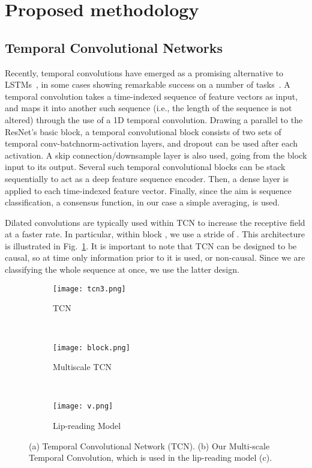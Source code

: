 \documentclass{article}
\begin{document}
\section{Proposed methodology}
\label{Methodology}


\subsection{Temporal Convolutional Networks} 
\label{ssec:tcn}

Recently, temporal convolutions have emerged as a promising alternative to LSTMs~\cite{BaiTCN2018}, in some cases showing remarkable success on a number of tasks~\cite{wavenet}. A temporal convolution takes a time-indexed sequence of feature vectors as input, and maps it into another such sequence (i.e., the length of the sequence is not altered) through the use of a 1D temporal convolution. Drawing a parallel to the ResNet's basic block, a temporal convolutional block consists of two sets of temporal conv-batchnorm-activation layers, and dropout can be used after each activation. A skip connection/downsample layer is also used, going from the block input to its output. Several such temporal convolutional blocks can be stack sequentially to act as a deep feature sequence encoder. Then, a dense layer is applied to each time-indexed feature vector. Finally, since the aim is sequence classification, a consensus function, in our case a simple averaging, is used.

Dilated convolutions are typically used within TCN to increase the receptive field at a faster rate. In particular, within block , we use a stride of . This architecture is illustrated in Fig.~\ref{fig:TCN}. It is important to note that TCN can be designed to be causal, so at time  only information prior to it is used, or non-causal. Since we are classifying the whole sequence at once, we use the latter design.


\begin{figure*}
    \centering
    \begin{subfigure}[b]{0.45\textwidth}
        \texttt{[image: tcn3.png]}
        \caption{TCN}
        \label{fig:TCN}
    \end{subfigure}
    ~ \begin{subfigure}[b]{0.34\textwidth}
        \texttt{[image: block.png]}
        \caption{Multiscale TCN}
        \label{fig:MultiTCN}
    \end{subfigure} 
    ~ \begin{subfigure}[b]{0.18\textwidth}
        \texttt{[image: v.png]}
        \caption{Lip-reading Model}
        \label{fig:LipreadingModel}
    \end{subfigure}
    \caption{(a) Temporal Convolutional Network (TCN). (b) Our Multi-scale Temporal Convolution, which is used in the lip-reading model (c).}\label{fig:modelFig}
\end{figure*}
\end{document}
